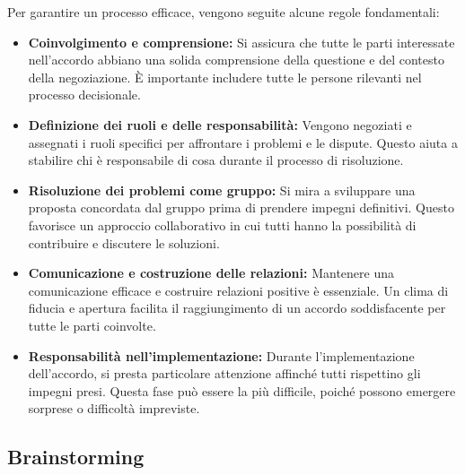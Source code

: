 \documentclass[oneside]{book}
\begin{document}
Per garantire un processo efficace, vengono seguite alcune regole fondamentali:

\begin{itemize}
    \item \textbf{Coinvolgimento e comprensione:} Si assicura che tutte le parti interessate nell'accordo abbiano una solida comprensione della questione e del contesto della negoziazione. È importante includere tutte le persone rilevanti nel processo decisionale.
    \item \textbf{Definizione dei ruoli e delle responsabilità:} Vengono negoziati e assegnati i ruoli specifici per affrontare i problemi e le dispute. Questo aiuta a stabilire chi è responsabile di cosa durante il processo di risoluzione.
    \item \textbf{Risoluzione dei problemi come gruppo:} Si mira a sviluppare una proposta concordata dal gruppo prima di prendere impegni definitivi. Questo favorisce un approccio collaborativo in cui tutti hanno la possibilità di contribuire e discutere le soluzioni.
    \item \textbf{Comunicazione e costruzione delle relazioni:} Mantenere una comunicazione efficace e costruire relazioni positive è essenziale. Un clima di fiducia e apertura facilita il raggiungimento di un accordo soddisfacente per tutte le parti coinvolte.
    \item \textbf{Responsabilità nell'implementazione:} Durante l'implementazione dell'accordo, si presta particolare attenzione affinché tutti rispettino gli impegni presi. Questa fase può essere la più difficile, poiché possono emergere sorprese o difficoltà impreviste.
\end{itemize}


\subsection{Brainstorming}
\end{document}
